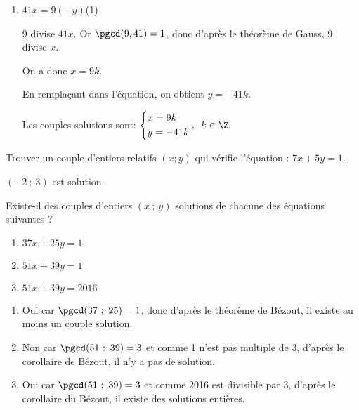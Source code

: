 \begin{colonne*exercice}
\begin{corrige}
\begin{enumerate}
On  a donc $x+3=4k$. 

En remplaçant dans l'équation, on obtient $y=5k$.

Les couples solutions sont :
$\left\{\begin{aligned}
&x\hskip-.5mm=-\hskip-.5mm3+4k\\
&y\hskip-.5mm=\hskip-.5mm5k\end{aligned}\right.\hskip-.5mm, k\in\Z$

\item $41x=9(-y)$\enskip (1)

  9 divise $41x$. Or $\pgcd(9,41)=1$, donc d'après le théorème de
  Gauss, 9 divise $x$.

On  a donc $x=9k$. 

En remplaçant dans l'équation, on obtient $y=-41k$.

Les couples solutions sont: 
$\left\{\begin{aligned}
&x=9k\\
&y=-41k\end{aligned}\right.,\enskip k\in\Z$
\end{enumerate}
\end{corrige}

\begin{exercice*}
  Trouver un couple d’entiers relatifs $(x ; y)$ qui vérifie
  l’équation : $7x+5y=1$.
\end{exercice*}
\begin{corrige}
  $(-2\ ;\ 3)$ est solution.
\end{corrige}

\begin{exercice*}
  Existe-il des couples d’entiers $(x\ ;\ y)$ solutions de chacune des
  équations suivantes ?
\begin{enumerate}
\item $37x + 25y = 1$
\item $51x + 39y = 1$
\item $51x + 39y = 2016$
\end{enumerate}
\end{exercice*}
\begin{corrige}
  \begin{enumerate}
  \item Oui car $\pgcd(37\ ;\ 25)=1$, donc d'après le théorème de
    Bézout, il existe au moins un couple solution.
  \item Non car $\pgcd(51\ ;\ 39)=3$ et comme 1 n'est pas multiple de
    3, d'après le corollaire de Bézout, il n'y a pas de solution.
  \item Oui car $\pgcd(51\ ;\ 39)=3$ et comme 2016 est divisible par
    3, d'après le corollaire du Bézout, il existe des solutions
    entières.
\end{enumerate}
\end{corrige}


\end{colonne*exercice}

